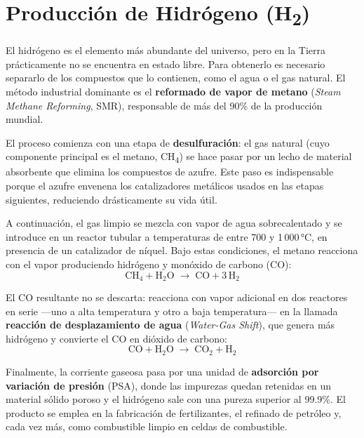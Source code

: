 \documentclass{article}
\begin{document}
    \portada{}
    \newpage
    

    \section{Producción de Hidrógeno (H\textsubscript{2})}

    El hidrógeno es el elemento más abundante del universo, pero en la Tierra
    prácticamente no se encuentra en estado libre. Para obtenerlo es necesario
    separarlo de los compuestos que lo contienen, como el agua o el gas natural.
    El método industrial dominante es el \textbf{reformado de vapor de metano}
    (\textit{Steam Methane Reforming}, SMR), responsable de más del 90\% de la
    producción mundial.

    El proceso comienza con una etapa de \textbf{desulfuración}: el gas natural
    (cuyo componente principal es el metano, CH\textsubscript{4}) se hace pasar
    por un lecho de material absorbente que elimina los compuestos de azufre. Este
    paso es indispensable porque el azufre envenena los catalizadores metálicos
    usados en las etapas siguientes, reduciendo drásticamente su vida útil.

    A continuación, el gas limpio se mezcla con vapor de agua sobrecalentado y se
    introduce en un reactor tubular a temperaturas de entre 700 y 1\,000\,°C, en
    presencia de un catalizador de níquel. Bajo estas condiciones, el metano
    reacciona con el vapor produciendo hidrógeno y monóxido de carbono (CO):
    \begin{equation}
        \text{CH}_4 + \text{H}_2\text{O} \;\rightarrow\; \text{CO} + 3\,\text{H}_2
    \end{equation}

    El CO resultante no se descarta: reacciona con vapor adicional en dos reactores
    en serie —uno a alta temperatura y otro a baja temperatura— en la llamada
    \textbf{reacción de desplazamiento de agua} (\textit{Water-Gas Shift}), que
    genera más hidrógeno y convierte el CO en dióxido de carbono:
    \begin{equation}
        \text{CO} + \text{H}_2\text{O} \;\rightarrow\; \text{CO}_2 + \text{H}_2
    \end{equation}

    Finalmente, la corriente gaseosa pasa por una unidad de \textbf{adsorción por
    variación de presión} (PSA), donde las impurezas quedan retenidas en un
    material sólido poroso y el hidrógeno sale con una pureza superior al 99.9\%.
    El producto se emplea en la fabricación de fertilizantes, el refinado de
    petróleo y, cada vez más, como combustible limpio en celdas de combustible.
\end{document}
